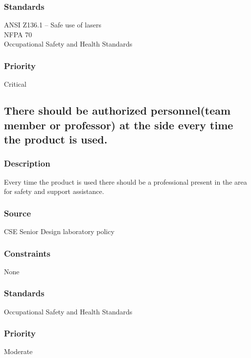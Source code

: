 \subsubsection{Standards}
ANSI Z136.1 – Safe use of lasers\\
NFPA 70\\
Occupational Safety and Health Standards
\subsubsection{Priority}
Critical

\subsection{There should be authorized personnel(team member or professor) at the side every time the product is used.}
\subsubsection{Description}
Every time the product is used there should be a professional present in the area for safety and support assistance.
\subsubsection{Source}
CSE Senior Design laboratory policy
\subsubsection{Constraints}
None
\subsubsection{Standards}
Occupational Safety and Health Standards
\subsubsection{Priority}
Moderate
